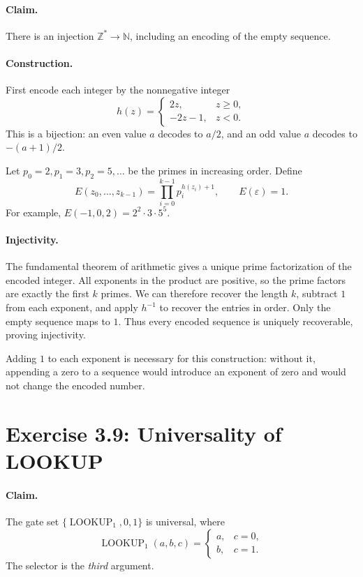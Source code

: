 \documentclass[UTF8,fontset=fandol,11pt,a4paper]{ctexart}
\newcommand{\LOOKUP}{\operatorname{LOOKUP}}
\begin{document}
\paragraph{Claim.}
There is an injection $\mathbb Z^*\to\mathbb N$, including an encoding
of the empty sequence.

\paragraph{Construction.}
First encode each integer by the nonnegative integer
\[
 h(z)=
 \begin{cases}
  2z,&z\ge0,\\
  -2z-1,&z<0.
 \end{cases}
\]
This is a bijection: an even value $a$ decodes to $a/2$, and an odd
value $a$ decodes to $-(a+1)/2$.

Let $p_0=2,p_1=3,p_2=5,\ldots$ be the primes in increasing order.
Define
\[
 E(z_0,\ldots,z_{k-1})=\prod_{i=0}^{k-1}p_i^{h(z_i)+1},
 \qquad E(\varepsilon)=1.
\]
For example, $E(-1,0,2)=2^2\cdot3\cdot5^5$.

\paragraph{Injectivity.}
The fundamental theorem of arithmetic gives a unique prime
factorization of the encoded integer. All exponents in the product
are positive, so the prime factors are exactly the first $k$ primes.
We can therefore recover the length $k$, subtract $1$ from each exponent,
and apply $h^{-1}$ to recover the entries in order.
Only the empty sequence maps to $1$.
Thus every encoded sequence is uniquely recoverable, proving injectivity.

Adding $1$ to each exponent is necessary for this construction:
without it, appending a zero to a sequence would introduce an exponent
of zero and would not change the encoded number.

\section{Exercise 3.9: Universality of LOOKUP}

\paragraph{Claim.}
The gate set $\{\LOOKUP_1,0,1\}$ is universal, where
\[
 \LOOKUP_1(a,b,c)=
 \begin{cases}
  a,&c=0,\\
  b,&c=1.
 \end{cases}
\]
The selector is the \emph{third} argument.
\end{document}
